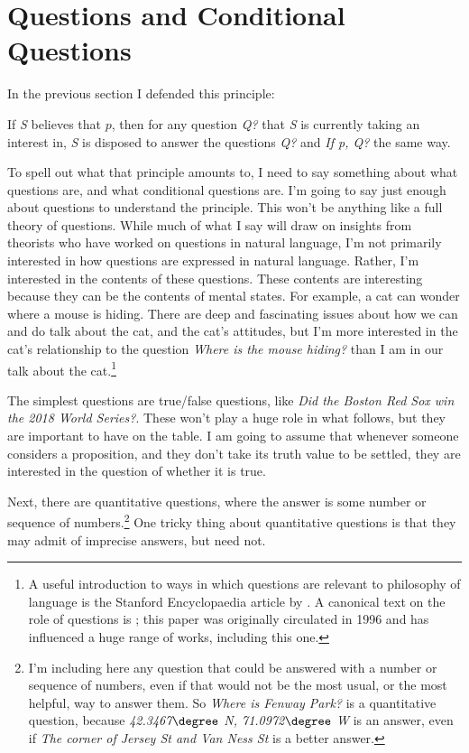 \documentclass[11pt,]{book}
\providecommand{\tightlist}{%
  \setlength{\itemsep}{0pt}\setlength{\parskip}{0pt}}
\let\rmarkdownfootnote\footnote%
\def\footnote{\protect\rmarkdownfootnote}
\begin{document}
\hypertarget{questions}{%
\section{Questions and Conditional Questions}\label{questions}}

In the previous section I defended this principle:

\begin{description}
\tightlist
\item[Relevant Conditional Questions]
If \emph{S} believes that \(p\), then for any question \emph{Q?} that \emph{S} is currently taking an interest in, \emph{S} is disposed to answer the questions \emph{Q?} and \emph{If p, Q?} the same way.
\end{description}

To spell out what that principle amounts to, I need to say something about what questions are, and what conditional questions are. I'm going to say just enough about questions to understand the principle. This won't be anything like a full theory of questions. While much of what I say will draw on insights from theorists who have worked on questions in natural language, I'm not primarily interested in how questions are expressed in natural language. Rather, I'm interested in the contents of these questions. These contents are interesting because they can be the contents of mental states. For example, a cat can wonder where a mouse is hiding. There are deep and fascinating issues about how we can and do talk about the cat, and the cat's attitudes, but I'm more interested in the cat's relationship to the question \emph{Where is the mouse hiding?} than I am in our talk about the cat.\footnote{A useful introduction to ways in which questions are relevant to philosophy of language is the Stanford Encyclopaedia article by \citet{sep-questions}. A canonical text on the role of questions is \citet{Roberts2012}; this paper was originally circulated in 1996 and has influenced a huge range of works, including this one.}

The simplest questions are true/false questions, like \emph{Did the Boston Red Sox win the 2018 World Series?}. These won't play a huge role in what follows, but they are important to have on the table. I am going to assume that whenever someone considers a proposition, and they don't take its truth value to be settled, they are interested in the question of whether it is true.

Next, there are quantitative questions, where the answer is some number or sequence of numbers.\footnote{I'm including here any question that could be answered with a number or sequence of numbers, even if that would not be the most usual, or the most helpful, way to answer them. So \emph{Where is Fenway Park?} is a quantitative question, because \emph{42.3467\(\degree\) N, 71.0972\(\degree\) W} is an answer, even if \emph{The corner of Jersey St and Van Ness St} is a better answer.} One tricky thing about quantitative questions is that they may admit of imprecise answers, but need not.
\end{document}
